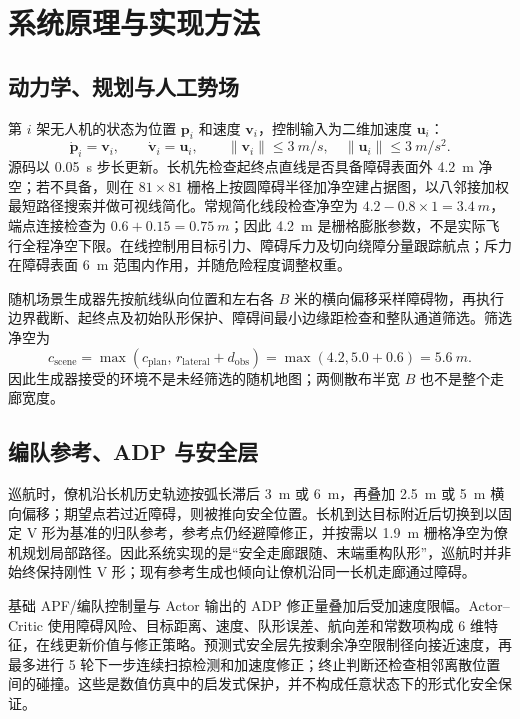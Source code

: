 \documentclass[UTF8,a4paper,11pt,fontset=windows]{ctexart}
\begin{document}
\section{系统原理与实现方法}
\subsection{动力学、规划与人工势场}
第 $i$ 架无人机的状态为位置 $\bm p_i$ 和速度 $\bm v_i$，控制输入为二维加速度 $\bm u_i$：
\begin{equation}
\dot{\bm p}_i=\bm v_i,\qquad
\dot{\bm v}_i=\bm u_i,\qquad
\|\bm v_i\|\leq \SI{3}{m/s},\quad
\|\bm u_i\|\leq\SI{3}{m/s^2}.
\end{equation}
源码以 \SI{0.05}{s} 步长更新。长机先检查起终点直线是否具备障碍表面外 \SI{4.2}{m} 净空；若不具备，则在 $81\times81$ 栅格上按圆障碍半径加净空建占据图，以八邻接加权最短路径搜索并做可视线简化。常规简化线段检查净空为 $4.2-0.8\times1=\SI{3.4}{m}$，端点连接检查为 $0.6+0.15=\SI{0.75}{m}$；因此 \SI{4.2}{m} 是栅格膨胀参数，不是实际飞行全程净空下限。在线控制用目标引力、障碍斥力及切向绕障分量跟踪航点；斥力在障碍表面 \SI{6}{m} 范围内作用，并随危险程度调整权重。

随机场景生成器先按航线纵向位置和左右各 $B$ 米的横向偏移采样障碍物，再执行边界截断、起终点及初始队形保护、障碍间最小边缘距检查和整队通道筛选。筛选净空为
\begin{equation}
c_{\mathrm{scene}}=\max\!\left(c_{\mathrm{plan}},\,r_{\mathrm{lateral}}+d_{\mathrm{obs}}\right)
=\max(4.2,5.0+0.6)=\SI{5.6}{m}.
\end{equation}
因此生成器接受的环境不是未经筛选的随机地图；两侧散布半宽 $B$ 也不是整个走廊宽度。

\subsection{编队参考、ADP 与安全层}
巡航时，僚机沿长机历史轨迹按弧长滞后 \SI{3}{m} 或 \SI{6}{m}，再叠加 \SI{2.5}{m} 或 \SI{5}{m} 横向偏移；期望点若过近障碍，则被推向安全位置。长机到达目标附近后切换到以固定 V 形为基准的归队参考，参考点仍经避障修正，并按需以 \SI{1.9}{m} 栅格净空为僚机规划局部路径。因此系统实现的是“安全走廊跟随、末端重构队形”，巡航时并非始终保持刚性 V 形；现有参考生成也倾向让僚机沿同一长机走廊通过障碍。

基础 APF/编队控制量与 Actor 输出的 ADP 修正量叠加后受加速度限幅。Actor--Critic 使用障碍风险、目标距离、速度、队形误差、航向差和常数项构成 6 维特征，在线更新价值与修正策略。预测式安全层先按剩余净空限制径向接近速度，再最多进行 5 轮下一步连续扫掠检测和加速度修正；终止判断还检查相邻离散位置间的碰撞。这些是数值仿真中的启发式保护，并不构成任意状态下的形式化安全保证。
\end{document}
